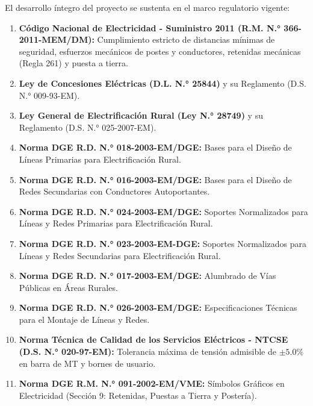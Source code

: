 El desarrollo íntegro del proyecto se sustenta en el marco regulatorio vigente:
\begin{enumerate}
  \item \textbf{Código Nacional de Electricidad - Suministro 2011 (R.M. N.° 366-2011-MEM/DM):} Cumplimiento estricto de distancias mínimas de seguridad, esfuerzos mecánicos de postes y conductores, retenidas mecánicas (Regla 261) y puesta a tierra.
  \item \textbf{Ley de Concesiones Eléctricas (D.L. N.° 25844)} y su Reglamento (D.S. N.° 009-93-EM).
  \item \textbf{Ley General de Electrificación Rural (Ley N.° 28749)} y su Reglamento (D.S. N.° 025-2007-EM).
  \item \textbf{Norma DGE R.D. N.° 018-2003-EM/DGE:} Bases para el Diseño de Líneas Primarias para Electrificación Rural.
  \item \textbf{Norma DGE R.D. N.° 016-2003-EM/DGE:} Bases para el Diseño de Redes Secundarias con Conductores Autoportantes.
  \item \textbf{Norma DGE R.D. N.° 024-2003-EM/DGE:} Soportes Normalizados para Líneas y Redes Primarias para Electrificación Rural.
  \item \textbf{Norma DGE R.D. N.° 023-2003-EM-DGE:} Soportes Normalizados para Líneas y Redes Secundarias para Electrificación Rural.
  \item \textbf{Norma DGE R.D. N.° 017-2003-EM/DGE:} Alumbrado de Vías Públicas en Áreas Rurales.
  \item \textbf{Norma DGE R.D. N.° 026-2003-EM/DGE:} Especificaciones Técnicas para el Montaje de Líneas y Redes.
  \item \textbf{Norma Técnica de Calidad de los Servicios Eléctricos - NTCSE (D.S. N.° 020-97-EM):} Tolerancia máxima de tensión admisible de $\pm 5.0\%$ en barra de MT y bornes de usuario.
  \item \textbf{Norma DGE R.M. N.° 091-2002-EM/VME:} Símbolos Gráficos en Electricidad (Sección 9: Retenidas, Puestas a Tierra y Postería).
\end{enumerate}

